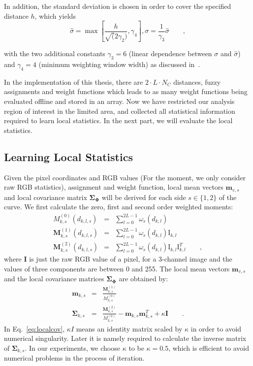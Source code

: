 In addition, the standard
deviation is chosen in order to cover the specified distance $h$,
which yields 
\begin{equation}
  \label{eq:deviation}
  \hat{\sigma} = \max \left[\frac{h}{\sqrt(2\gamma_2)}, \gamma_4
  \right], \sigma  = \frac{1}{\gamma_3} \hat{\sigma}\qquad,
\end{equation}

with the two additional constants $\gamma_3 = 6$ (linear dependence
between $\sigma$ and $\hat{\sigma}$) and $\gamma_4 = 4$ (minimum
weighting window width) as discussed in~\cite{panin2006efficient}. 

In the implementation of this thesis,
there are $2 \cdot L \cdot N_C$ distances, fuzzy assignments
and weight functions which leads to as many weight functions being evaluated offline and stored in an array. Now we have restricted our analysis region of interest in the
limited area, and collected all statistical information required to learn
local statistics. In the next part, we will evaluate the local
statistics.

\subsection{Learning Local Statistics}
\label{sec:lls}

Given the pixel coordinates and RGB values (For the moment, we only consider raw RGB
statistics), assignment and weight
function, local mean vectors $\mathbf{m}_{v,s}$  and local covariance matrix
$\mathbf{\Sigma}_{\mathbf{\Phi}}$ will be derived for each side $s \in
\{1,2\}$ of the curve.
We first calculate the zero, first and second order weighted moments:
\begin{eqnarray}
  \label{eq:localm}
  M_{k,s}^{(0)}(d_{k,l,s}) &=& \sum_{l=0}^{2L-1} \omega_s(d_{k,l})\\
  \mathbf{M}_{k,s}^{(1)}(d_{k,l,s}) &=& \sum_{l=0}^{2L-1} \omega_s(d_{k,l}) \mathrm{I}_{k,l}\\
  \mathbf{M}_{k,s}^{(2)}(d_{k,l,s}) &=& \sum_{l=0}^{2L-1} \omega_s(d_{k,l}) \mathrm{I}_{k,l}\mathrm{I}_{k,l}^T\qquad,
\end{eqnarray}
where $\mathbf{I}$ is just the raw RGB value of a pixel, for a
3-channel image and the values of three components
are  between 0 and 255. The local mean vectors $\mathbf{m}_{v,s}$  and
the local covariance matrices
$\mathbf{\Sigma}_{\mathbf{\Phi}}$  are obtained by:
\begin{eqnarray}
  \label{eq:localmean}
  \mathbf{m}_{k,s} &=& \frac{\mathbf{M}^{(1)}_{k,s}}{M^{(0)}_{k,s}}\\
  \label{eq:localcov}
  \mathbf{\Sigma}_{k,s} &=& \frac{\mathbf{M}^{(2)}_{k,s}}{M^{(0)}_{k,s}}
  - \mathbf{m}_{k,s}\mathbf{m}_{k,s}^T  + \kappa \mathbf{I}\qquad.
\end{eqnarray}
In Eq.~\ref{eq:localcov}, $\kappa I$  means an identity matrix scaled by
$\kappa$ in order to avoid numerical singularity. Later it is namely
required to calculate the inverse matrix of
$\mathbf{\Sigma}_{k,s}$. In our experiments, we choose $\kappa$ to be
$\kappa = 0.5$, which is efficient to avoid numerical problems in the
process of iteration.

